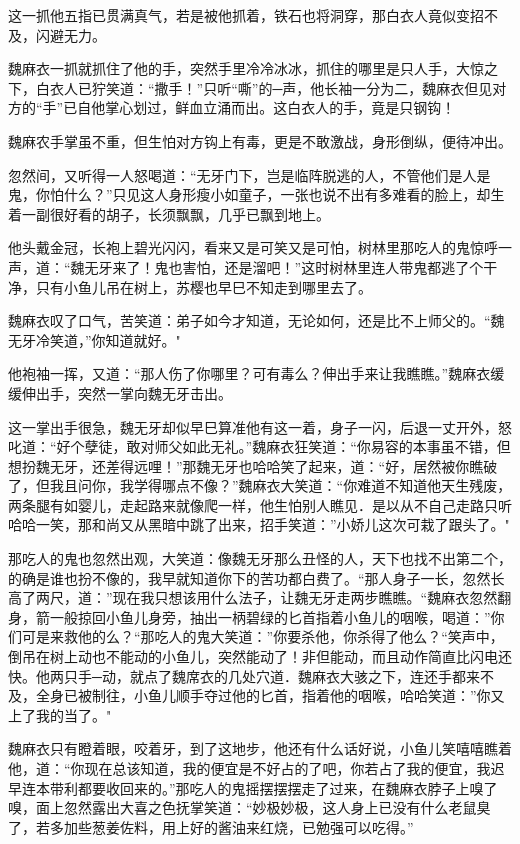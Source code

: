 \documentclass[12pt,oneside]{book}
\begin{document}
这一抓他五指已贯满真气，若是被他抓着，铁石也将洞穿，那白衣人竟似变招不及，闪避无力。

魏麻衣一抓就抓住了他的手，突然手里冷冷冰冰，抓住的哪里是只人手，大惊之下，白衣人已狞笑道：``撒手！''只听``嘶''的─声，他长袖一分为二，魏麻衣但见对方的``手''已自他掌心划过，鲜血立涌而出。这白衣人的手，竟是只钢钩！

魏麻农手掌虽不重，但生怕对方钩上有毒，更是不敢激战，身形倒纵，便待冲出。

忽然间，又听得一人怒喝道：``无牙门下，岂是临阵脱逃的人，不管他们是人是鬼，你怕什么？''只见这人身形瘦小如童子，一张也说不出有多难看的脸上，却生着一副很好看的胡子，长须飘飘，几乎已飘到地上。

他头戴金冠，长袍上碧光闪闪，看来又是可笑又是可怕，树林里那吃人的鬼惊呼一声，道：``魏无牙来了！鬼也害怕，还是溜吧！''这时树林里连人带鬼都逃了个干净，只有小鱼儿吊在树上，苏樱也早巳不知走到哪里去了。

魏麻衣叹了口气，苦笑道：弟子如今才知道，无论如何，还是比不上师父的。``魏无牙冷笑道，''你知道就好。"

他袍袖一挥，又道：``那人伤了你哪里？可有毒么？伸出手来让我瞧瞧。''魏麻衣缓缓伸出手，突然一掌向魏无牙击出。

这一掌出手很急，魏无牙却似早巳算准他有这一着，身子一闪，后退一丈开外，怒叱道：``好个孽徒，敢对师父如此无礼。''魏麻衣狂笑道：``你易容的本事虽不错，但想扮魏无牙，还差得远哩！''那魏无牙也哈哈笑了起来，道：``好，居然被你瞧破了，但我且问你，我学得哪点不像？''魏麻衣大笑道：``你难道不知道他天生残废，两条腿有如婴儿，走起路来就像爬一样，他生怕别人瞧见．是以从不自己走路只听哈哈一笑，那和尚又从黑暗中跳了出来，招手笑道：''小娇儿这次可栽了跟头了。"

那吃人的鬼也忽然出观，大笑道：像魏无牙那么丑怪的人，天下也找不出第二个，的确是谁也扮不像的，我早就知道你下的苦功都白费了。``那人身子一长，忽然长高了两尺，道：''现在我只想该用什么法子，让魏无牙走两步瞧瞧。``魏麻衣忽然翻身，箭一般掠回小鱼儿身旁，抽出一柄碧绿的匕首指着小鱼儿的咽喉，喝道：''你们可是来救他的么？``那吃人的鬼大笑道：''你要杀他，你杀得了他么？``笑声中，倒吊在树上动也不能动的小鱼儿，突然能动了！非但能动，而且动作简直比闪电还快。他两只手─动，就点了魏席衣的几处穴道．魏麻衣大骇之下，连还手都来不及，全身已被制往，小鱼儿顺手夺过他的匕首，指着他的咽喉，哈哈笑道：''你又上了我的当了。"

魏麻衣只有瞪着眼，咬着牙，到了这地步，他还有什么话好说，小鱼儿笑嘻嘻瞧着他，道：``你现在总该知道，我的便宜是不好占的了吧，你若占了我的便宜，我迟早连本带利都要收回来的。''那吃人的鬼摇摆摆摆走了过来，在魏麻衣脖子上嗅了嗅，面上忽然露出大喜之色抚掌笑道：``妙极妙极，这人身上已没有什么老鼠臭了，若多加些葱姜佐料，用上好的酱油来红烧，已勉强可以吃得。''
\end{document}
